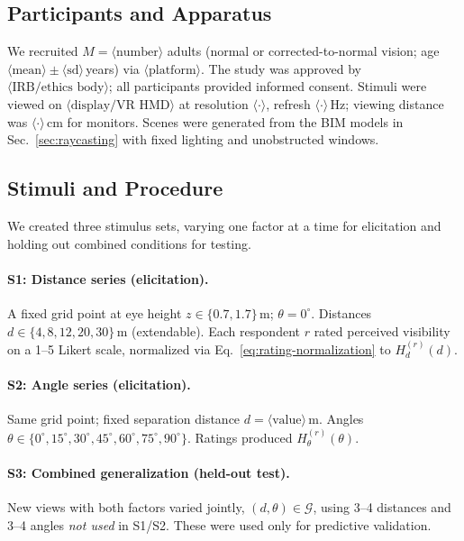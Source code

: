 \documentclass[final,3p,times,review]{elsarticle}
\begin{document}
\subsection{Participants and Apparatus}
We recruited $M=\langle \text{number} \rangle$ adults (normal or corrected-to-normal vision; age $\langle \text{mean}\rangle\pm\langle \text{sd}\rangle$\,years) via $\langle \text{platform} \rangle$. The study was approved by $\langle \text{IRB/ethics body} \rangle$; all participants provided informed consent. Stimuli were viewed on $\langle \text{display/VR HMD} \rangle$ at resolution $\langle \cdot \rangle$, refresh $\langle \cdot \rangle$\,Hz; viewing distance was $\langle \cdot \rangle$\,cm for monitors. Scenes were generated from the BIM models in Sec.~\ref{sec:raycasting} with fixed lighting and unobstructed windows.

\subsection{Stimuli and Procedure}
We created three stimulus sets, varying one factor at a time for elicitation and holding out combined conditions for testing.

\paragraph{S1: Distance series (elicitation).}
A fixed grid point at eye height $z\in\{0.7,1.7\}$\,m; $\theta=0^\circ$. Distances $d\in\{4,8,12,20,30\}$\,m (extendable). Each respondent $r$ rated perceived visibility on a 1--5 Likert scale, normalized via Eq.~\eqref{eq:rating-normalization} to $H^{(r)}_d(d)$.

\paragraph{S2: Angle series (elicitation).}
Same grid point; fixed separation distance $d=\langle \text{value} \rangle$\,m. Angles $\theta\in\{0^\circ,15^\circ,30^\circ,45^\circ,60^\circ,75^\circ,90^\circ\}$. Ratings produced $H^{(r)}_\theta(\theta)$.

\paragraph{S3: Combined generalization (held-out test).}
New views with both factors varied jointly, $(d,\theta)\in\mathcal{G}$, using 3--4 distances and 3--4 angles \emph{not used} in S1/S2. These were used only for predictive validation.
\end{document}
